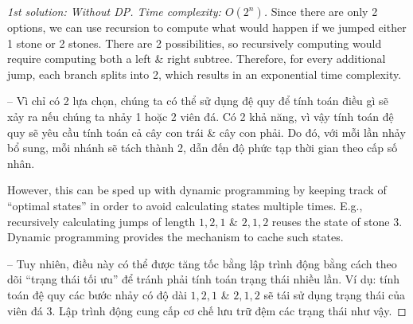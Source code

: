 \documentclass{article}
\begin{document}
\begin{proof}[1st solution: Without DP. Time complexity: $O(2^n)$]
    Since there are only 2 options, we can use recursion to compute what would happen if we jumped either 1 stone or 2 stones. There are 2 possibilities, so recursively computing would require computing both a left \& right subtree. Therefore, for every additional jump, each branch splits into 2, which results in an exponential time complexity.

    -- Vì chỉ có 2 lựa chọn, chúng ta có thể sử dụng đệ quy để tính toán điều gì sẽ xảy ra nếu chúng ta nhảy 1 hoặc 2 viên đá. Có 2 khả năng, vì vậy tính toán đệ quy sẽ yêu cầu tính toán cả cây con trái \& cây con phải. Do đó, với mỗi lần nhảy bổ sung, mỗi nhánh sẽ tách thành 2, dẫn đến độ phức tạp thời gian theo cấp số nhân.

    However, this can be sped up with dynamic programming by keeping track of ``optimal states'' in order to avoid calculating states multiple times. E.g., recursively calculating jumps of length $1,2,1$ \& $2,1,2$ reuses the state of stone 3. Dynamic programming provides the mechanism to cache such states.

    -- Tuy nhiên, điều này có thể được tăng tốc bằng lập trình động bằng cách theo dõi ``trạng thái tối ưu'' để tránh phải tính toán trạng thái nhiều lần. Ví dụ: tính toán đệ quy các bước nhảy có độ dài $1,2,1$ \& $2,1,2$ sẽ tái sử dụng trạng thái của viên đá 3. Lập trình động cung cấp cơ chế lưu trữ đệm các trạng thái như vậy.
\end{proof}
\end{document}
